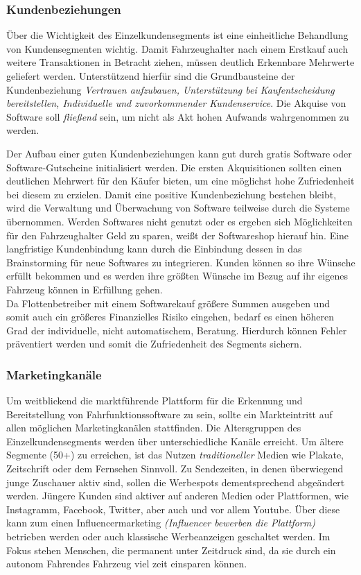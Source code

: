\subsubsection{Kundenbeziehungen}
Über die Wichtigkeit des Einzelkundensegments ist eine einheitliche Behandlung von Kundensegmenten wichtig. Damit Fahrzeughalter nach einem Erstkauf auch weitere Transaktionen in Betracht ziehen, müssen deutlich Erkennbare Mehrwerte geliefert werden. Unterstützend hierfür sind die Grundbausteine der Kundenbeziehung \textit{Vertrauen aufzubauen, Unterstützung bei Kaufentscheidung bereitstellen, Individuelle und zuvorkommender Kundenservice}. Die Akquise von Software soll \textit{fließend} sein, um nicht als Akt hohen Aufwands wahrgenommen zu werden.

Der Aufbau einer guten Kundenbeziehungen kann gut durch gratis Software oder Software-Gutscheine initialisiert werden. Die ersten Akquisitionen sollten einen deutlichen Mehrwert für den Käufer bieten, um eine möglichst hohe Zufriedenheit bei diesem zu erzielen. Damit eine positive Kundenbeziehung bestehen bleibt, wird die Verwaltung und Überwachung von Software teilweise durch die Systeme übernommen. Werden Softwares nicht genutzt oder es ergeben sich Möglichkeiten für den Fahrzeughalter Geld zu sparen, weißt der Softwareshop hierauf hin. Eine langfristige Kundenbindung kann durch die Einbindung dessen in das Brainstorming für neue Softwares zu integrieren. Kunden können so ihre Wünsche erfüllt bekommen und es werden ihre größten Wünsche im Bezug auf ihr eigenes Fahrzeug können in Erfüllung gehen.\\
Da Flottenbetreiber mit einem Softwarekauf größere Summen ausgeben und somit auch ein größeres Finanzielles Risiko eingehen, bedarf es einen höheren Grad der individuelle, nicht automatischem, Beratung. Hierdurch können Fehler präventiert werden und somit die Zufriedenheit des Segments sichern.
\subsubsection{Marketingkanäle}
Um weitblickend die marktführende Plattform für die Erkennung und Bereitstellung von Fahrfunktionssoftware zu sein, sollte ein Markteintritt auf allen möglichen Marketingkanälen stattfinden. Die Altersgruppen des Einzelkundensegments werden über unterschiedliche Kanäle erreicht. Um ältere Segmente (50+) zu erreichen, ist das Nutzen \textit{traditioneller} Medien wie Plakate, Zeitschrift oder dem Fernsehen Sinnvoll. Zu Sendezeiten, in denen überwiegend junge Zuschauer aktiv sind, sollen die Werbespots dementsprechend abgeändert werden. Jüngere Kunden sind aktiver auf anderen Medien oder Plattformen, wie Instagramm, Facebook, Twitter, aber auch und vor allem Youtube. Über diese kann zum einen Influencermarketing \textit{(Influencer bewerben die Plattform)} betrieben werden oder auch klassische Werbeanzeigen geschaltet werden. Im Fokus stehen Menschen, die permanent unter Zeitdruck sind, da sie durch ein autonom Fahrendes Fahrzeug viel zeit einsparen können.

